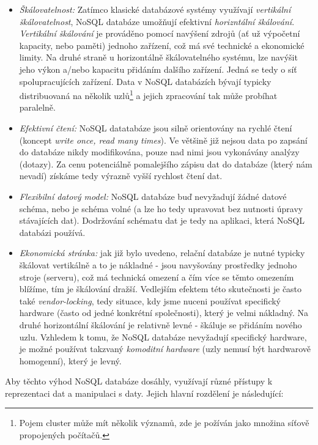 \begin{itemize}
  \item{\textit{Škálovatelnost:}} Zatímco klasické databázové systémy využívají \textit{vertikální škálovatelnost}, NoSQL databáze umožňují efektivní \textit{horizntální škálování}. \textit{Vertikální škálování} je prováděno pomocí navýšení zdrojů (ať už výpočetní kapacity, nebo paměti) jednoho zařízení, což má své technické a ekonomické limity. Na druhé straně u horizontálně škálovatelného systému, lze navýšit jeho výkon a/nebo kapacitu přidáním dalšího zařízení. Jedná se tedy o síť spolupracujících zařízení. Data v NoSQL databázích bývají typicky distribuovaná na několik uzlů\footnote{Pojem cluster může mít několik významů, zde je požíván jako množina síťově propojených počítačů.} a jejich zpracování tak může probíhat paralelně. 
  \item{\textit{Efektivní čtení:}} NoSQL datatabáze jsou silně orientovány na rychlé čtení (koncept \textit{write once, read many times}). Ve většině již nejsou data po zapsání do databáze nikdy modifikována, pouze nad nimi jsou vykonávány analýzy (dotazy). Za cenu potenciálně pomalejšího zápisu dat do databáze (který nám nevadí) získáme tedy výrazně vyšší rychlost čtení dat.  
  \item{\textit{Flexibilní datový model:}} NoSQL databáze buď nevyžadují žádné datové schéma, nebo je schéma volné (a lze ho tedy upravovat bez nutnosti úpravy stávajících dat). Dodržování schématu dat je tedy na aplikaci, která NoSQL databázi používá.  
  \item{\textit{Ekonomická stránka:}} jak již bylo uvedeno, relační databáze je nutné typicky škálovat vertikálně a to je nákladné - jsou navyšovány prostředky jednoho stroje (serveru), což má technická omezení a čím více se těmto omezením blížíme, tím je škálování dražší. Vedlejším efektem této skutečnosti je často také \textit{vendor-locking}, tedy situace, kdy jsme nuceni používat specifický hardware (často od jedné konkrétní společnosti), který je velmi nákladný. Na druhé horizontální škálování je relativně levné - škáluje se přidáním nového uzlu. Vzhledem k tomu, že NoSQL databáze nevyžadují specifický hardware, je možné používat takzvaný \textit{komoditní hardware} (uzly nemusí být hardwarově homogenní), který je levný.  
\end{itemize}

Aby těchto výhod NoSQL databáze dosáhly, využívají různé přístupy k reprezentaci dat a manipulaci s daty. Jejich hlavní rozdělení je následující: 

